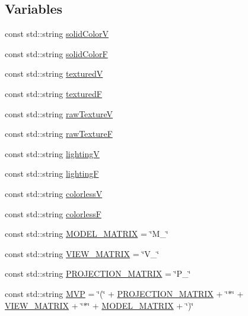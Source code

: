 \subsection*{Variables}
\begin{DoxyCompactItemize}
\item 
const std\-::string \hyperlink{namespaceburn_a6eafdfe4d85acab9368409999e505dd3}{solid\-Color\-V}
\item 
const std\-::string \hyperlink{namespaceburn_ab930855fc914e51fe8d7f734a5534c6d}{solid\-Color\-F}
\item 
const std\-::string \hyperlink{namespaceburn_a3d60f931a7ad5b52bf67858342c6621a}{textured\-V}
\item 
const std\-::string \hyperlink{namespaceburn_aa50f80a84ae71807267b64cdb3b06b3e}{textured\-F}
\item 
const std\-::string \hyperlink{namespaceburn_adda519b7f874b2d7f463ee2a761b869f}{raw\-Texture\-V}
\item 
const std\-::string \hyperlink{namespaceburn_ad03d19988ac03d79b4e2a4714da49c18}{raw\-Texture\-F}
\item 
const std\-::string \hyperlink{namespaceburn_a78bde68a8e56b05d88971530a815c479}{lighting\-V}
\item 
const std\-::string \hyperlink{namespaceburn_a01739beb4fb70b50d2f18f0f2ca82b62}{lighting\-F}
\item 
const std\-::string \hyperlink{namespaceburn_ac819ca068b6bba609abb0f725fa3b778}{colorless\-V}
\item 
const std\-::string \hyperlink{namespaceburn_ad168558e196bd8b02d6da9e256dd01c7}{colorless\-F}
\item 
const std\-::string \hyperlink{namespaceburn_aef2bc91c4c84fa143da611ee2f284c8b}{M\-O\-D\-E\-L\-\_\-\-M\-A\-T\-R\-I\-X} = \char`\"{}M\-\_\-\char`\"{}
\item 
const std\-::string \hyperlink{namespaceburn_a7cb7c6572d4f7796ea3e5edae85e51f1}{V\-I\-E\-W\-\_\-\-M\-A\-T\-R\-I\-X} = \char`\"{}V\-\_\-\char`\"{}
\item 
const std\-::string \hyperlink{namespaceburn_ae5e90743826abef0fbc9d54704ae2a6f}{P\-R\-O\-J\-E\-C\-T\-I\-O\-N\-\_\-\-M\-A\-T\-R\-I\-X} = \char`\"{}P\-\_\-\char`\"{}
\item 
const std\-::string \hyperlink{namespaceburn_a7c71b053f299e14c880f0f11ba916a44}{M\-V\-P} = \char`\"{}(\char`\"{} + \hyperlink{namespaceburn_ae5e90743826abef0fbc9d54704ae2a6f}{P\-R\-O\-J\-E\-C\-T\-I\-O\-N\-\_\-\-M\-A\-T\-R\-I\-X} + \char`\"{}$\ast$\char`\"{} + \hyperlink{namespaceburn_a7cb7c6572d4f7796ea3e5edae85e51f1}{V\-I\-E\-W\-\_\-\-M\-A\-T\-R\-I\-X} + \char`\"{}$\ast$\char`\"{} + \hyperlink{namespaceburn_aef2bc91c4c84fa143da611ee2f284c8b}{M\-O\-D\-E\-L\-\_\-\-M\-A\-T\-R\-I\-X} + \char`\"{})\char`\"{}

\end{DoxyCompactItemize}
